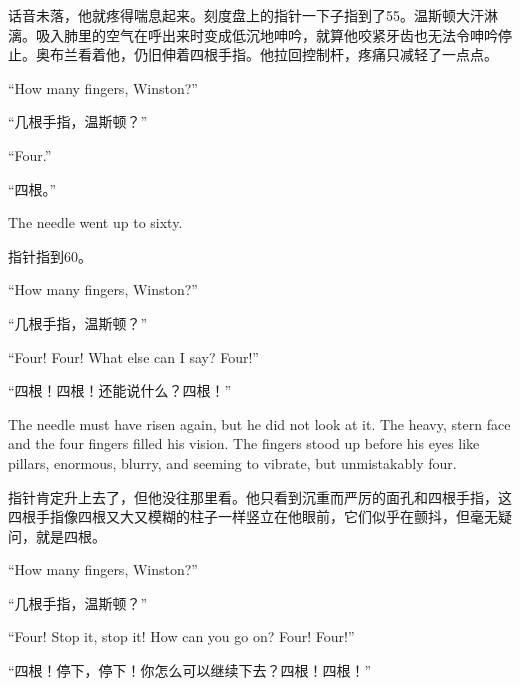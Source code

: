 \begin{paracol}{2}
\switchcolumn

话音未落，他就疼得喘息起来。刻度盘上的指针一下子指到了55。温斯顿大汗淋漓。吸入肺里的空气在呼出来时变成低沉地呻吟，就算他咬紧牙齿也无法令呻吟停止。奥布兰看着他，仍旧伸着四根手指。他拉回控制杆，疼痛只减轻了一点点。

\switchcolumn*

``How many fingers, Winston?''

\switchcolumn

``几根手指，温斯顿？''

\switchcolumn*

``Four.''

\switchcolumn

``四根。''

\switchcolumn*

The needle went up to sixty.

\switchcolumn

指针指到60。

\switchcolumn*

``How many fingers, Winston?''

\switchcolumn

``几根手指，温斯顿？''

\switchcolumn*

``Four! Four! What else can I say? Four!''

\switchcolumn

``四根！四根！还能说什么？四根！''

\switchcolumn*

The needle must have risen again, but he did not look at it. The heavy,
stern face and the four fingers filled his vision. The fingers stood up
before his eyes like pillars, enormous, blurry, and seeming to vibrate,
but unmistakably four.

\switchcolumn

指针肯定升上去了，但他没往那里看。他只看到沉重而严厉的面孔和四根手指，这四根手指像四根又大又模糊的柱子一样竖立在他眼前，它们似乎在颤抖，但毫无疑问，就是四根。

\switchcolumn*

``How many fingers, Winston?''

\switchcolumn

``几根手指，温斯顿？''

\switchcolumn*

``Four! Stop it, stop it! How can you go on? Four! Four!''

\switchcolumn

``四根！停下，停下！你怎么可以继续下去？四根！四根！''


\end{paracol}
